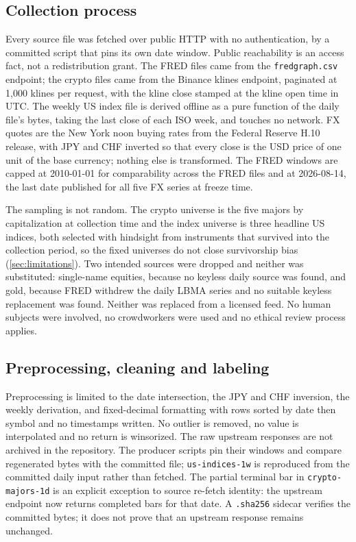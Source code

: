 \subsection{Collection process}

Every source file was fetched over public HTTP with no authentication, by a committed script that pins its own date window. Public reachability is an access fact, not a redistribution grant. The FRED files came from the \texttt{fredgraph.csv} endpoint; the crypto files came from the Binance klines endpoint, paginated at 1{,}000 klines per request, with the kline close stamped at the kline open time in UTC. The weekly US index file is derived offline as a pure function of the daily file's bytes, taking the last close of each ISO week, and touches no network. FX quotes are the New York noon buying rates from the Federal Reserve H.10 release, with JPY and CHF inverted so that every close is the USD price of one unit of the base currency; nothing else is transformed. The FRED windows are capped at 2010-01-01 for comparability across the FRED files and at 2026-08-14, the last date published for all five FX series at freeze time.

The sampling is not random. The crypto universe is the five majors by capitalization at collection time and the index universe is three headline US indices, both selected with hindsight from instruments that survived into the collection period, so the fixed universes do not close survivorship bias (\cref{sec:limitations}). Two intended sources were dropped and neither was substituted: single-name equities, because no keyless daily source was found, and gold, because FRED withdrew the daily LBMA series and no suitable keyless replacement was found. Neither was replaced from a licensed feed. No human subjects were involved, no crowdworkers were used and no ethical review process applies.

\subsection{Preprocessing, cleaning and labeling}

Preprocessing is limited to the date intersection, the JPY and CHF inversion, the weekly derivation, and fixed-decimal formatting with rows sorted by date then symbol and no timestamps written. No outlier is removed, no value is interpolated and no return is winsorized. The raw upstream responses are not archived in the repository. The producer scripts pin their windows and compare regenerated bytes with the committed file; \texttt{us-indices-1w} is reproduced from the committed daily input rather than fetched. The partial terminal bar in \texttt{crypto-majors-1d} is an explicit exception to source re-fetch identity: the upstream endpoint now returns completed bars for that date. A \texttt{.sha256} sidecar verifies the committed bytes; it does not prove that an upstream response remains unchanged.

